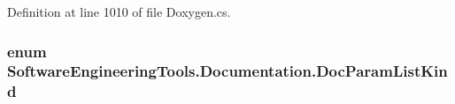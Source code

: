 Definition at line 1010 of file Doxygen.\+cs.

\hypertarget{namespace_software_engineering_tools_1_1_documentation_a386ec98ace7dcc510b3dc1035c7bfb15}{
\subsubsection[{Doc\+Param\+List\+Kind}]{\setlength{\rightskip}{0pt plus 5cm}enum {\bf Software\+Engineering\+Tools.\+Documentation.\+Doc\+Param\+List\+Kind}}}\label{namespace_software_engineering_tools_1_1_documentation_a386ec98ace7dcc510b3dc1035c7bfb15}
